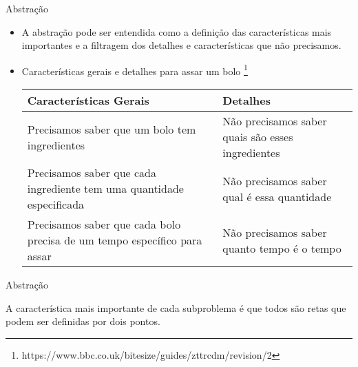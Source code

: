 \documentclass{beamer}
\begin{document}
\begin{frame}{Abstração}

\begin{itemize}
    \item A abstração pode ser entendida como a definição das características mais importantes e a filtragem dos detalhes e características que não precisamos.
    \item Características gerais e detalhes para assar um bolo \footnote{https://www.bbc.co.uk/bitesize/guides/zttrcdm/revision/2}
    
    \begin{tabular}{p{5cm}p{5cm}}
    Características Gerais & Detalhes \\
    \hline
    Precisamos saber que um bolo tem ingredientes & Não precisamos saber quais são esses ingredientes\\
    \hline
    Precisamos saber que cada ingrediente tem uma quantidade especificada & Não precisamos saber qual é essa quantidade\\
    \hline 
Precisamos saber que cada bolo precisa de um tempo específico para assar & Não precisamos saber quanto tempo é o tempo\\
    \end{tabular}
    
    
    
\end{itemize}



\end{frame}



\begin{frame}{Abstração}


A característica mais importante de cada subproblema é que todos são retas que podem ser definidas por dois pontos. 

\begin{center}

\end{center}


\end{frame}
\end{document}
